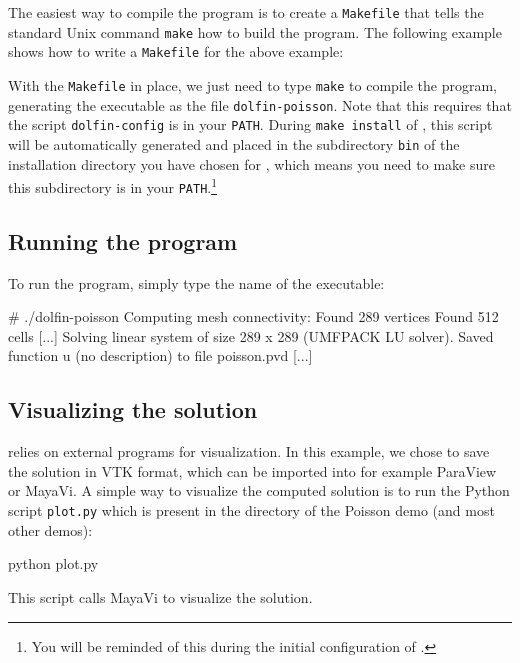 The easiest way to compile the program is to create a
\texttt{Makefile} that tells the standard Unix command \texttt{make}
how to build the program. The following example shows how to write a
\texttt{Makefile} for the above example:
\footnotesize
{}
\normalsize

With the \texttt{Makefile} in place, we just need to type
\texttt{make} to compile the program, generating the executable
as the file \texttt{dolfin-poisson}. Note that this requires that the
script \texttt{dolfin-config} is in your \texttt{PATH}. During
\texttt{make install} of \dolfin{}, this script will be
automatically generated and placed in the subdirectory \texttt{bin} of
the installation directory you have chosen for \dolfin{}, which
means you need to make sure this subdirectory is in your
\texttt{PATH}.\footnote{You will be reminded of this during the
  initial configuration of \dolfin{}.}

\subsection{Running the program}

To run the program, simply type the name of the executable:
\begin{code}
# ./dolfin-poisson
Computing mesh connectivity:
Found 289 vertices
Found 512 cells
[...]
Solving linear system of size 289 x 289 (UMFPACK LU solver).
Saved function u (no description) to file poisson.pvd [...]
\end{code}

\subsection{Visualizing the solution}

\dolfin{} relies on external programs for visualization. In this
example, we chose to save the solution in VTK format, which can be
imported into for example ParaView or MayaVi. A simple way to
visualize the computed solution is to run the Python script
\texttt{plot.py} which is present in the directory of the Poisson demo
(and most other demos):
\begin{code}
python plot.py
\end{code}
This script calls MayaVi to visualize the solution.


